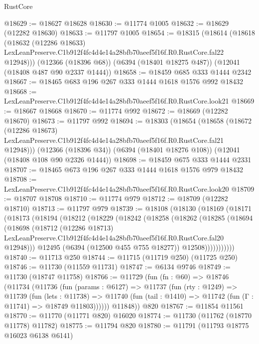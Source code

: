 \begin{lexlean}{RustCore}
\begin{coremodule}
@18629 := @18627 @18628
@18630 := @11774 @1005
@18632 := @18629 (@12282 @18630)
@18633 := @11797 @1005
@18654 := @18315
    (@18614
      (@18618
        (@18632
          (@12286 @18633)
          LexLeanPreserve.C1b912f4fc4d4e14a28bfb70aeef5f16f.R0.RustCore.fal22
          @12948)))
    (@12366 (@18396 @68))
    (@6394 (@18401 @18275 @487))
    (@12041 (@18408 @487 @90 @2337 @1444))
@18658 := @18459 @685 @333 @1444 @2342
@18667 := @18465 @683 @196 @267 @333 @1444 @1618 @1576 @992 @18432
@18668 := LexLeanPreserve.C1b912f4fc4d4e14a28bfb70aeef5f16f.R0.RustCore.look21
@18669 := @18667 @18668
@18670 := @11774 @992
@18672 := @18669 (@12282 @18670)
@18673 := @11797 @992
@18694 := @18303
    (@18654
      (@18658
        (@18672
          (@12286 @18673)
          LexLeanPreserve.C1b912f4fc4d4e14a28bfb70aeef5f16f.R0.RustCore.fal21
          @12948)))
    (@12366 (@18396 @34))
    (@6394 (@18401 @18276 @108))
    (@12041 (@18408 @108 @90 @2326 @1444))
@18698 := @18459 @675 @333 @1444 @2331
@18707 := @18465 @673 @196 @267 @333 @1444 @1618 @1576 @979 @18432
@18708 := LexLeanPreserve.C1b912f4fc4d4e14a28bfb70aeef5f16f.R0.RustCore.look20
@18709 := @18707 @18708
@18710 := @11774 @979
@18712 := @18709 (@12282 @18710)
@18713 := @11797 @979
@18739 := @18108
    (@18130
      (@18169
        (@18171
          (@18173
            (@18194
              (@18212
                (@18229
                  (@18242
                    (@18258
                      (@18262
                        (@18285
                          (@18694
                            (@18698
                              (@18712
                                (@12286 @18713)
                                LexLeanPreserve.C1b912f4fc4d4e14a28bfb70aeef5f16f.R0.RustCore.fal20
                                @12948)))
                          @12495
                          (@6394 (@12500 @455 @755 @18277))
                          @12508)))))))))))
@18740 := @11713 @250
@18744 := @11715 (@11719 @250) (@11725 @250)
@18746 := @11730 (@11559 @11731)
@18747 := @6134 @9746
@18749 := @11730 (@18747 @11758)
@18766 := @11729
    (fun (fn : @60) =>
    @18746
      (@11734
        (@11736
          (fun (params : @6127) =>
          @11737
            (fun (rty : @1249) =>
            @11739
              (fun (lets : @11738) =>
              @11740 (fun (tail : @1410) => @11742 (fun (Γ : @11741) => @18749 @11803))))))
        @11848))
    @820
@18767 := @11854 @11561
@18770 := @11770 (@11771 @820) @16020
@18774 := @11730 (@11762 (@18770 @11778) @11782)
@18775 := @11794 @820
@18780 := @11791 (@11793 @18775 @16023 @6138 @6141)

\end{coremodule}
\end{lexlean}
